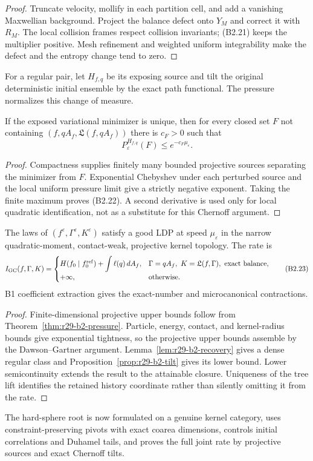 \begin{proof}
Truncate velocity, mollify in each partition cell, and add a vanishing
Maxwellian background.  Project the balance defect onto $Y_M$ and correct it
with $R_M$.  The local collision frames respect collision invariants; (B2.21)
keeps the multiplier positive.  Mesh refinement and weighted uniform
integrability make the defect and the entropy change tend to zero.
\end{proof}

For a regular pair, let $H_{f,q}$ be its exposing source and tilt the original
deterministic initial ensemble by the exact path functional.  The pressure
normalizes this change of measure.

\begin{proposition}
\label{prop:r29-b2-tilt}
If the exposed variational minimizer is unique, then for every closed set
$F$ not containing $(f,qA_f,\mathfrak L(f,qA_f))$ there is $c_F>0$ such that
\[
 P_{\varepsilon}^{H_{f,q}}(F)\le e^{-c_F\mu_\varepsilon}. \tag{B2.22}
\]
\end{proposition}

\begin{proof}
Compactness supplies finitely many bounded projective sources separating the
minimizer from $F$.  Exponential Chebyshev under each perturbed source and the
local uniform pressure limit give a strictly negative exponent.  Taking the
finite maximum proves (B2.22).  A second derivative is used only for local
quadratic identification, not as a substitute for this Chernoff argument.
\end{proof}

\begin{theorem}
\label{thm:r29-b2-ldp}
The laws of $(f^\varepsilon,\Gamma^\varepsilon,K^\varepsilon)$ satisfy a good
LDP at speed $\mu_\varepsilon$ in the narrow quadratic-moment,
contact-weak, projective kernel topology.  The rate is
\[
 I_{\rm GC}(f,\Gamma,K)=
 \begin{cases}
 H(f_0\mid f_0^{\rm ref})+\displaystyle\int\ell(q)\,dA_f,
 &\Gamma=qA_f,\ K=\mathfrak L(f,\Gamma),\ \text{exact balance},\\
 +\infty,&\text{otherwise}.
 \end{cases}                                             \tag{B2.23}
\]
B1 coefficient extraction gives the exact-number and microcanonical
contractions.
\end{theorem}

\begin{proof}
Finite-dimensional projective upper bounds follow from
Theorem~\ref{thm:r29-b2-pressure}.  Particle, energy, contact, and kernel-radius
bounds give exponential tightness, so the projective upper bounds assemble by
the Dawson--Gartner argument.  Lemma~\ref{lem:r29-b2-recovery} gives a
dense regular class and Proposition~\ref{prop:r29-b2-tilt} gives its lower
bound.  Lower semicontinuity extends the result to the attainable closure.
Uniqueness of the tree lift identifies the retained history coordinate rather
than silently omitting it from the rate.
\end{proof}

The hard-sphere root is now formulated on a genuine kernel category, uses
constraint-preserving pivots with exact coarea dimensions, controls initial
correlations and Duhamel tails, and proves the full joint rate by projective
sources and exact Chernoff tilts.
